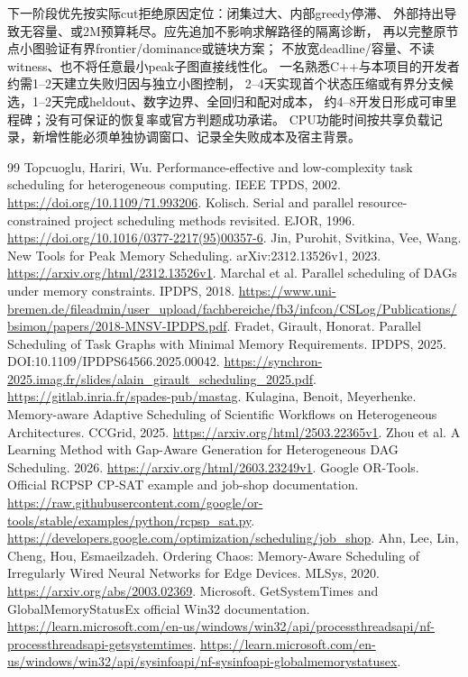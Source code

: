 \documentclass[UTF8,fontset=fandol,11pt]{ctexart}
\begin{document}
下一阶段优先按实际cut拒绝原因定位：闭集过大、内部greedy停滞、
外部持出导致无容量、或2M预算耗尽。应先追加不影响求解路径的隔离诊断，
再以完整原节点小图验证有界frontier/dominance或链块方案；
不放宽deadline/容量、不读witness、也不将任意最小peak子图直接线性化。
一名熟悉C++与本项目的开发者约需1--2天建立失败归因与独立小图控制，
2--4天实现首个状态压缩或有界分支候选，1--2天完成heldout、数字边界、全回归和配对成本，
约4--8开发日形成可审里程碑；没有可保证的恢复率或官方判题成功承诺。
CPU功能时间按共享负载记录，新增性能必须单独协调窗口、记录全失败成本及宿主背景。

\begin{thebibliography}{99}
 Topcuoglu, Hariri, Wu. Performance-effective and low-complexity task scheduling for heterogeneous computing. IEEE TPDS, 2002.
\url{https://doi.org/10.1109/71.993206}.
 Kolisch. Serial and parallel resource-constrained project scheduling methods revisited. EJOR, 1996.
\url{https://doi.org/10.1016/0377-2217(95)00357-6}.
 Jin, Purohit, Svitkina, Vee, Wang. New Tools for Peak Memory Scheduling. arXiv:2312.13526v1, 2023.
\url{https://arxiv.org/html/2312.13526v1}.
 Marchal et al. Parallel scheduling of DAGs under memory constraints. IPDPS, 2018.
\url{https://www.uni-bremen.de/fileadmin/user_upload/fachbereiche/fb3/infcon/CSLog/Publications/bsimon/papers/2018-MNSV-IPDPS.pdf}.
 Fradet, Girault, Honorat. Parallel Scheduling of Task Graphs with Minimal Memory Requirements. IPDPS, 2025.
DOI:10.1109/IPDPS64566.2025.00042.
\url{https://synchron-2025.imag.fr/slides/alain_girault_scheduling_2025.pdf}.
\url{https://gitlab.inria.fr/spades-pub/mastag}.
 Kulagina, Benoit, Meyerhenke. Memory-aware Adaptive Scheduling of Scientific Workflows on Heterogeneous Architectures. CCGrid, 2025.
\url{https://arxiv.org/html/2503.22365v1}.
 Zhou et al. A Learning Method with Gap-Aware Generation for Heterogeneous DAG Scheduling. 2026.
\url{https://arxiv.org/html/2603.23249v1}.
 Google OR-Tools. Official RCPSP CP-SAT example and job-shop documentation.
\url{https://raw.githubusercontent.com/google/or-tools/stable/examples/python/rcpsp_sat.py}.
\url{https://developers.google.com/optimization/scheduling/job_shop}.
 Ahn, Lee, Lin, Cheng, Hou, Esmaeilzadeh. Ordering Chaos: Memory-Aware Scheduling of Irregularly Wired Neural Networks for Edge Devices. MLSys, 2020.
\url{https://arxiv.org/abs/2003.02369}.
 Microsoft. GetSystemTimes and GlobalMemoryStatusEx official Win32 documentation.
\url{https://learn.microsoft.com/en-us/windows/win32/api/processthreadsapi/nf-processthreadsapi-getsystemtimes}.
\url{https://learn.microsoft.com/en-us/windows/win32/api/sysinfoapi/nf-sysinfoapi-globalmemorystatusex}.
\end{thebibliography}
\end{document}
